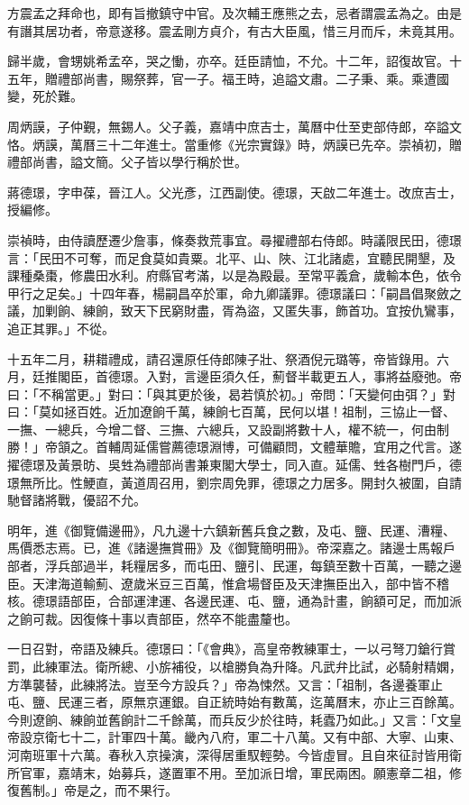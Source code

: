 \begin{pinyinscope}
方震孟之拜命也，即有旨撤鎮守中官。及次輔王應熊之去，忌者謂震孟為之。由是有譖其居功者，帝意遂移。震孟剛方貞介，有古大臣風，惜三月而斥，未竟其用。

歸半歲，會甥姚希孟卒，哭之慟，亦卒。廷臣請恤，不允。十二年，詔復故官。十五年，贈禮部尚書，賜祭葬，官一子。福王時，追謚文肅。二子秉、乘。乘遭國變，死於難。

周炳謨，子仲覲，無錫人。父子義，嘉靖中庶吉士，萬曆中仕至吏部侍郎，卒謚文恪。炳謨，萬曆三十二年進士。當重修《光宗實錄》時，炳謨已先卒。崇禎初，贈禮部尚書，謚文簡。父子皆以學行稱於世。

蔣德璟，字申葆，晉江人。父光彥，江西副使。德璟，天啟二年進士。改庶吉士，授編修。

崇禎時，由侍讀歷遷少詹事，條奏救荒事宜。尋擢禮部右侍郎。時議限民田，德璟言：「民田不可奪，而足食莫如貴粟。北平、山、陜、江北諸處，宜聽民開墾，及課種桑棗，修農田水利。府縣官考滿，以是為殿最。至常平義倉，歲輸本色，依令甲行之足矣。」十四年春，楊嗣昌卒於軍，命九卿議罪。德璟議曰：「嗣昌倡聚斂之議，加剿餉、練餉，致天下民窮財盡，胥為盜，又匿失事，飾首功。宜按仇鸞事，追正其罪。」不從。

十五年二月，耕耤禮成，請召還原任侍郎陳子壯、祭酒倪元璐等，帝皆錄用。六月，廷推閣臣，首德璟。入對，言邊臣須久任，薊督半載更五人，事將益廢弛。帝曰：「不稱當更。」對曰：「與其更於後，曷若慎於初。」帝問：「天變何由弭？」對曰：「莫如拯百姓。近加遼餉千萬，練餉七百萬，民何以堪！祖制，三協止一督、一撫、一總兵，今增二督、三撫、六總兵，又設副將數十人，權不統一，何由制勝！」帝頷之。首輔周延儒嘗薦德璟淵博，可備顧問，文體華贍，宜用之代言。遂擢德璟及黃景昉、吳甡為禮部尚書兼東閣大學士，同入直。延儒、甡各樹門戶，德璟無所比。性鯁直，黃道周召用，劉宗周免罪，德璟之力居多。開封久被圍，自請馳督諸將戰，優詔不允。

明年，進《御覽備邊冊》，凡九邊十六鎮新舊兵食之數，及屯、鹽、民運、漕糧、馬價悉志焉。已，進《諸邊撫賞冊》及《御覽簡明冊》。帝深嘉之。諸邊士馬報戶部者，浮兵部過半，耗糧居多，而屯田、鹽引、民運，每鎮至數十百萬，一聽之邊臣。天津海道輸薊、遼歲米豆三百萬，惟倉場督臣及天津撫臣出入，部中皆不稽核。德璟語部臣，合部運津運、各邊民運、屯、鹽，通為計畫，餉額可足，而加派之餉可裁。因復條十事以責部臣，然卒不能盡釐也。

一日召對，帝語及練兵。德璟曰：「《會典》，高皇帝教練軍士，一以弓弩刀鎗行賞罰，此練軍法。衛所總、小旂補役，以槍勝負為升降。凡武弁比試，必騎射精嫻，方準襲替，此練將法。豈至今方設兵？」帝為悚然。又言：「祖制，各邊養軍止屯、鹽、民運三者，原無京運銀。自正統時始有數萬，迄萬曆末，亦止三百餘萬。今則遼餉、練餉並舊餉計二千餘萬，而兵反少於往時，耗蠹乃如此。」又言：「文皇帝設京衛七十二，計軍四十萬。畿內八府，軍二十八萬。又有中部、大寧、山東、河南班軍十六萬。春秋入京操演，深得居重馭輕勢。今皆虛冒。且自來征討皆用衛所官軍，嘉靖末，始募兵，遂置軍不用。至加派日增，軍民兩困。願憲章二祖，修復舊制。」帝是之，而不果行。


\end{pinyinscope}
